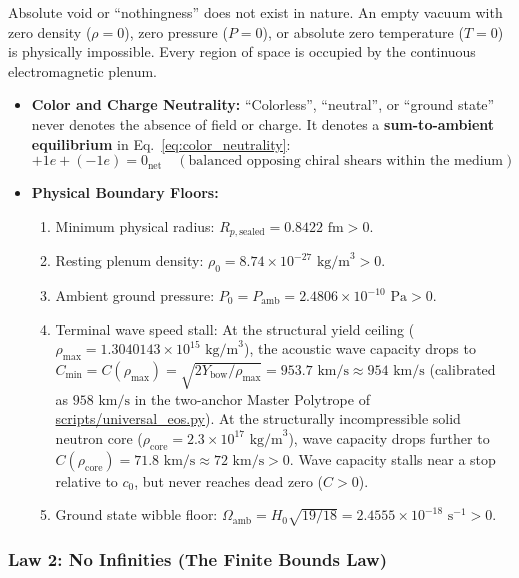 \documentclass[11pt,a4paper]{article}
\begin{document}
Absolute void or ``nothingness'' does not exist in nature. An empty vacuum with zero density ($\rho = 0$), zero pressure ($P = 0$), or absolute zero temperature ($T = 0$) is physically impossible. Every region of space is occupied by the continuous electromagnetic plenum.
\begin{itemize}
    \item \textbf{Color and Charge Neutrality:} ``Colorless'', ``neutral'', or ``ground state'' never denotes the absence of field or charge. It denotes a \textbf{sum-to-ambient equilibrium} in Eq.~\eqref{eq:color_neutrality}:
    \begin{equation}
    +1e + (-1e) = 0_{\text{net}} \quad (\text{balanced opposing chiral shears within the medium})
    \label{eq:color_neutrality}
    \end{equation}
    \item \textbf{Physical Boundary Floors:}
    \begin{enumerate}
        \item Minimum physical radius: $R_{p,\text{sealed}} = 0.8422\text{ fm} > 0$.
        \item Resting plenum density: $\rho_0 = 8.74 \times 10^{-27}\text{ kg/m}^3 > 0$.
        \item Ambient ground pressure: $P_0 = P_{\text{amb}} = 2.4806 \times 10^{-10}\text{ Pa} > 0$.
        \item Terminal wave speed stall: At the structural yield ceiling ($\rho_{\max} = 1.3040143 \times 10^{15}\text{ kg/m}^3$), the acoustic wave capacity drops to $C_{\min} = C(\rho_{\max}) = \sqrt{2Y_{\text{bow}}/\rho_{\max}} = 953.7\text{ km/s} \approx 954\text{ km/s}$ (calibrated as $958\text{ km/s}$ in the two-anchor Master Polytrope of \url{scripts/universal_eos.py}). At the structurally incompressible solid neutron core ($\rho_{\text{core}} = 2.3 \times 10^{17}\text{ kg/m}^3$), wave capacity drops further to $C(\rho_{\text{core}}) = 71.8\text{ km/s} \approx 72\text{ km/s} > 0$. Wave capacity stalls near a stop relative to $c_0$, but never reaches dead zero ($C > 0$).
        \item Ground state wibble floor: $\Omega_{\text{amb}} = H_0 \sqrt{19/18} = 2.4555 \times 10^{-18}\text{ s}^{-1} > 0$.
    \end{enumerate}
\end{itemize}

\subsubsection{Law 2: No Infinities (The Finite Bounds Law)}
\label{subsubsec:law_2_no_infinities}
\end{document}

